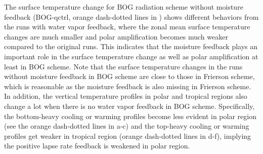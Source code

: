 
The surface temperature change for BOG radiation scheme without moisture feedback (BOG-qctrl, orange dash-dotted lines in ) shows different behaviors from the runs with water vapor feedback, where the zonal mean surface temperature changes are much smaller and polar amplification becomes much weaker compared to the original runs. This indicates that the moisture feedback plays an important role in the surface temperature change as well as polar amplification at least in BOG scheme. Note that the surface temperature changes in the runs without moisture feedback in BOG scheme are close to those in Frierson scheme, which is reasonable as the moisture feedback is also missing in Frierson scheme. In addition, the vertical temperature profiles in polar and tropical regions also change a lot when there is no water vapor feedback in BOG scheme. Specifically, the bottom-heavy cooling or warming profiles become less evident in polar region (see the orange dash-dotted lines in a-c) and the top-heavy cooling or warming profiles get weaker in tropical region (orange dash-dotted lines in d-f), implying the positive lapse rate feedback is weakened in polar region.


